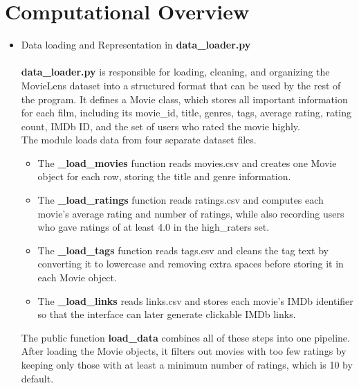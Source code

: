 \documentclass[fontsize=11pt]{article}
\begin{document}
\section*{Computational Overview}
\begin{itemize}
    \item Data loading and Representation in \textbf{data\_loader.py}
    \\
    \\
    \textbf{data\_loader.py} is responsible for loading, cleaning, and organizing the MovieLens dataset into a structured format that can be used by the rest of the program. It defines a Movie class, which stores all important information for each film, including its movie\_id, title, genres, tags, average rating, rating count, IMDb ID, and the set of users who rated the movie highly.
    \\
    The module loads data from four separate dataset files. 
    \begin{itemize}
        \item The \textbf{\_load\_movies} function reads movies.csv and creates one Movie object for each row, storing the title and genre information.
        \item The \textbf{\_load\_ratings} function reads ratings.csv and computes each movie’s average rating and number of ratings, while also recording users who gave ratings of at least 4.0 in the high\_raters set.
        \item The \textbf{\_load\_tags} function reads tags.csv and cleans the tag text by converting it to lowercase and removing extra spaces before storing it in each Movie object.
        \item The \textbf{\_load\_links} reads links.csv and stores each movie’s IMDb identifier so that the interface can later generate clickable IMDb links.
    \end{itemize}
    
    The public function \textbf{load\_data} combines all of these steps into one pipeline. After loading the Movie objects, it filters out movies with too few ratings by keeping only those with at least a minimum number of ratings, which is 10 by default.  
    

\end{itemize}
\end{document}
